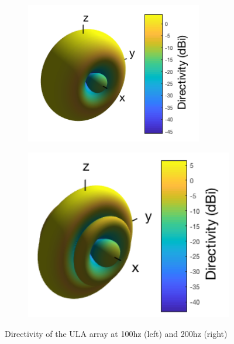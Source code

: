 \begin{figure}[H]
\centering
\begin{subfigure}{.5\textwidth}
    \includegraphics[width=0.85\textwidth]{Figures/ula100hzdirectivity.png}
    \label{fig:directivity100hzuca}
\end{subfigure}%
\begin{subfigure}{.5\textwidth}
    \centering
    \includegraphics[width=1.1\textwidth]{Figures/ula200hzdirectivity.png}
    \label{fig:directivity100hzula}
\end{subfigure}
\caption{Directivity of the ULA array at 100hz (left) and 200hz (right)}
\label{fig:directivityothers}
\end{figure}
